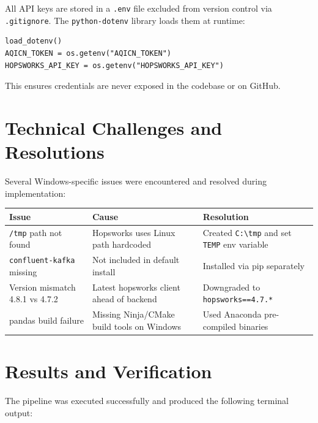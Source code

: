 \documentclass[conference]{IEEEtran}
\begin{document}
All API keys are stored in a \texttt{.env} file excluded from version control via \texttt{.gitignore}. The \texttt{python-dotenv} library loads them at runtime:

\begin{lstlisting}
load_dotenv()
AQICN_TOKEN = os.getenv("AQICN_TOKEN")
HOPSWORKS_API_KEY = os.getenv("HOPSWORKS_API_KEY")
\end{lstlisting}

This ensures credentials are never exposed in the codebase or on GitHub.

\section{Technical Challenges and Resolutions}

Several Windows-specific issues were encountered and resolved during implementation:

\begin{center}
\begin{tabular}{|L{2.5cm}|L{2.5cm}|L{2.5cm}|}
\hline
\textbf{Issue} & \textbf{Cause} & \textbf{Resolution} \\
\hline
\texttt{/tmp} path not found & Hopsworks uses Linux path hardcoded & Created \texttt{C:\textbackslash tmp} and set \texttt{TEMP} env variable \\
\hline
\texttt{confluent-kafka} missing & Not included in default install & Installed via pip separately \\
\hline
Version mismatch 4.8.1 vs 4.7.2 & Latest hopsworks client ahead of backend & Downgraded to \texttt{hopsworks==4.7.*} \\
\hline
pandas build failure & Missing Ninja/CMake build tools on Windows & Used Anaconda pre-compiled binaries \\
\hline
\end{tabular}
\end{center}

\section{Results and Verification}

The pipeline was executed successfully and produced the following terminal output:
\end{document}
